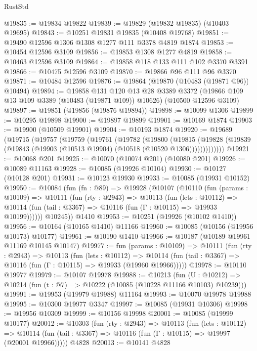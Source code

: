 \begin{lexlean}{RustStd}
\begin{coremodule}
@19835 := @19834 @19822
@19839 := @19829 (@19832 @19835) (@10403 @19695)
@19843 := @10251 @19831 @19835 (@10408 @19768)
@19851 := @19490 @12596 @1306 @1308 @1277 @111 @3378 @4819 @1874
@19853 := @10454 @12596 @3109
@19856 := @19853 @1308 @1277 @4819
@19858 := @10463 @12596 @3109
@19864 := @19858 @118 @133 @111 @102 @3370 @3391
@19866 := @10475 @12596 @3109
@19870 := @19866 @96 @111 @96 @3370
@19871 := @10484 @12596
@19876 := @19864 (@19870 (@10483 (@19871 @96)) @10494)
@19894 := @19858
    @131
    @120
    @13
    @28
    @3389
    @3372
    (@19866 @109 @13 @109 @3389 (@10483 (@19871 @109)) @10626)
    (@10500 @12596 @3109)
@19897 := @19851 (@19856 (@19876 @19894))
@19898 := @10099 @1306
@19899 := @10295 @19898
@19900 := @19897 @19899
@19901 := @10169 @1874
@19903 := @19900 (@10509 @19901)
@19904 := @10193 @1874
@19920 := @19689
    (@19715
      (@19757
        (@19759
          (@19761
            (@19782
              (@19800
                (@19815
                  (@19828 (@19839 (@19843 (@19903 (@10513 @19904) (@10518 (@10520 @1306)))))))))))))
@19921 := @10068 @201
@19925 := @10070 (@10074 @201) (@10080 @201)
@19926 := @10089 @11163
@19928 := @10085 (@19926 @10104)
@19930 := @10127 (@10128 @201)
@19931 := @10123 @19930
@19933 := @10085 (@19931 @10152)
@19950 := @10084
    (fun (fn : @89) =>
    @19928
      (@10107
        (@10110
          (fun (params : @10109) =>
          @10111
            (fun (rty : @2943) =>
            @10113
              (fun (lets : @10112) =>
              @10114 (fun (tail : @3367) => @10116 (fun (Γ : @10115) => @19933 @10199))))))
        @10245))
    @1410
@19953 := @10251 (@19926 (@10102 @1410))
@19956 := @10164 (@10165 @1410) @11166
@19960 := @10085 (@10156 (@19956 @10173) @10177)
@19961 := @10190 @1410
@19966 := @10187 (@10189 @19961 @11169 @10145 @10147)
@19977 := fun (params : @10109) =>
  @10111
    (fun (rty : @2943) =>
    @10113
      (fun (lets : @10112) =>
      @10114 (fun (tail : @3367) => @10116 (fun (Γ : @10115) => @19933 (@19960 @19966)))))
@19978 := @10110 @19977
@19979 := @10107 @19978
@19988 := @10213
    (fun (U : @10212) => @10214 (fun (t : @7) => @10222 (@10085 (@10228 @11166 @10103) @10239)))
@19991 := @19953 (@19979 @19988) @11164
@19993 := @10070 @19978 @19988
@19995 := @10300 @19977 @3347
@19997 := @10085 (@19931 @10306)
@19998 := @19956 @10309
@19999 := @10156 @19998
@20001 := @10085 (@19999 @10177)
@20012 := @10303
    (fun (rty : @2943) =>
    @10113
      (fun (lets : @10112) =>
      @10114 (fun (tail : @3367) => @10116 (fun (Γ : @10115) => @19997 (@20001 @19966)))))
    @4828
@20013 := @10141 @4828

\end{coremodule}
\end{lexlean}
